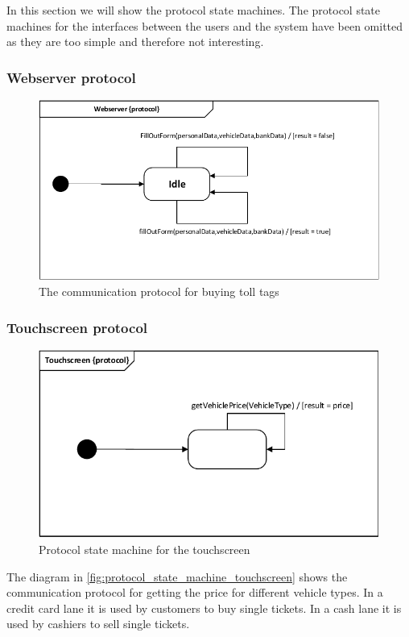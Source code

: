 In this section we will show the protocol state machines. The protocol state machines for the interfaces between the users and the system have been omitted as they are too simple and therefore not interesting.
\subsubsection*{Webserver protocol}
\begin{figure}[H]
\centering
\includegraphics[width=0.7\linewidth]{img/behaviour_state_machines/protocol_state_machines/protocol_state_machine_webserver_to_enterprise}
\caption{The communication protocol for buying toll tags}
\label{fig:protocol_state_machine_webserver_to_enterprise}
\end{figure}

\subsubsection*{Touchscreen protocol}
\begin{figure}[H]
\centering
\includegraphics[width=0.7\linewidth]{img/behaviour_state_machines/protocol_state_machines/protocol_state_machine_touchscreen}
\caption{Protocol state machine for the touchscreen}
\label{fig:protocol_state_machine_touchscreen}
\end{figure}
The diagram in \autoref{fig:protocol_state_machine_touchscreen} shows the communication protocol for getting the price for different vehicle types. In a credit card lane it is used by customers to buy single tickets. In a cash lane it is used by cashiers to sell single tickets.

